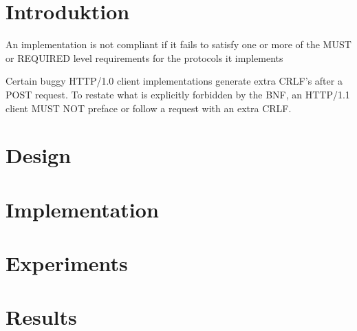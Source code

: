 \documentclass[a4paper,12pt,danish]{report}
\begin{document}
\section{Introduktion}
An implementation is not compliant if it fails to satisfy one or more
   of the MUST or REQUIRED level requirements for the protocols it
   implements
   
   
   Certain buggy HTTP/1.0 client implementations generate extra CRLF's
   after a POST request. To restate what is explicitly forbidden by the
   BNF, an HTTP/1.1 client MUST NOT preface or follow a request with an
   extra CRLF.
\section{Design}
\section{Implementation}
\section{Experiments}
\section{Results}
\end{document}
